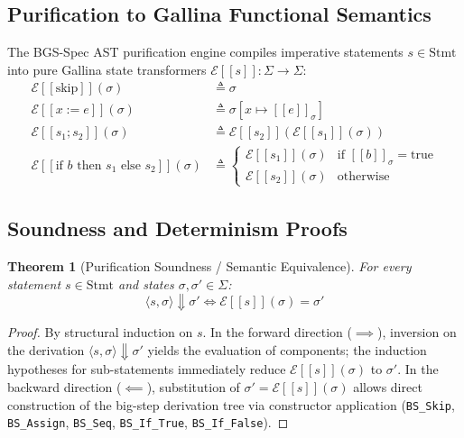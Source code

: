 \documentclass[10pt,journal,compsoc]{IEEEtran}
\newcommand{\llbracket}{[\![}
\newcommand{\rrbracket}{]\!]}
\newtheorem{theorem}{Theorem}
\begin{document}
\subsection{Purification to Gallina Functional Semantics}
The BGS-Spec AST purification engine compiles imperative statements $s \in \text{Stmt}$ into pure Gallina state transformers $\mathcal{E}\llbracket s \rrbracket : \Sigma \to \Sigma$:
\begin{align}
\mathcal{E}\llbracket \text{skip} \rrbracket(\sigma) &\triangleq \sigma \\
\mathcal{E}\llbracket x := e \rrbracket(\sigma) &\triangleq \sigma[x \mapsto \llbracket e \rrbracket_\sigma] \\
\mathcal{E}\llbracket s_1; s_2 \rrbracket(\sigma) &\triangleq \mathcal{E}\llbracket s_2 \rrbracket(\mathcal{E}\llbracket s_1 \rrbracket(\sigma)) \\
\mathcal{E}\llbracket \text{if } b \text{ then } s_1 \text{ else } s_2 \rrbracket(\sigma) &\triangleq \begin{cases}
\mathcal{E}\llbracket s_1 \rrbracket(\sigma) & \text{if } \llbracket b \rrbracket_\sigma = \text{true} \\
\mathcal{E}\llbracket s_2 \rrbracket(\sigma) & \text{otherwise}
\end{cases}
\end{align}
\enlargethispage{3\baselineskip}

\subsection{Soundness and Determinism Proofs}

\begin{theorem}[Purification Soundness / Semantic Equivalence]
For every statement $s \in \text{Stmt}$ and states $\sigma, \sigma' \in \Sigma$:
\begin{equation}
\langle s, \sigma \rangle \Downarrow \sigma' \iff \mathcal{E}\llbracket s \rrbracket(\sigma) = \sigma'
\end{equation}
\end{theorem}
\begin{proof}
By structural induction on $s$.
In the forward direction ($\implies$), inversion on the derivation $\langle s, \sigma \rangle \Downarrow \sigma'$ yields the evaluation of components; the induction hypotheses for sub-statements immediately reduce $\mathcal{E}\llbracket s \rrbracket(\sigma)$ to $\sigma'$.
In the backward direction ($\impliedby$), substitution of $\sigma' = \mathcal{E}\llbracket s \rrbracket(\sigma)$ allows direct construction of the big-step derivation tree via constructor application (\texttt{BS\_Skip}, \texttt{BS\_Assign}, \texttt{BS\_Seq}, \texttt{BS\_If\_True}, \texttt{BS\_If\_False}).
\end{proof}
\end{document}
